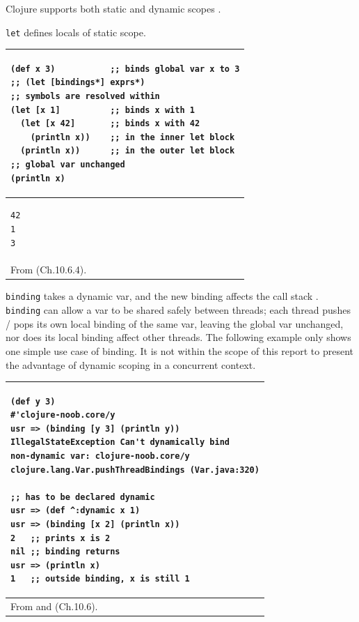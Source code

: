 \documentclass[12pt]{article}
\begin{document}
Clojure supports both static and dynamic scopes \cite{fogus2014joy}. 

\texttt{let} defines locals of static scope.


\begin{tabular}{|p{}|}
\hline
\begin{verbatim}
(def x 3)           ;; binds global var x to 3
;; (let [bindings*] exprs*)
;; symbols are resolved within 
(let [x 1]          ;; binds x with 1
  (let [x 42]       ;; binds x with 42
    (println x))    ;; in the inner let block
  (println x))      ;; in the outer let block
;; global var unchanged
(println x)
\end{verbatim}
\\
\hline
\begin{verbatim}
42
1
3
\end{verbatim}
\\
\hline
From \cite{empty} \cite{fogus2014joy} (Ch.10.6.4).\\
\hline
\end{tabular}

\texttt{binding} takes a dynamic var, and the new binding affects the call stack \cite{binding}. \texttt{binding} can allow a var to be shared safely between threads; each thread pushes / pops its own local binding of the same var, leaving the global var unchanged, nor does its local binding affect other threads. The following example only shows one simple use case of binding. It is not within the scope of this report to present the advantage of dynamic scoping in a concurrent context.



\begin{tabular}{|p{}|}
\hline
\begin{verbatim}
(def y 3)
#'clojure-noob.core/y
usr => (binding [y 3] (println y))
IllegalStateException Can't dynamically bind 
non-dynamic var: clojure-noob.core/y 
clojure.lang.Var.pushThreadBindings (Var.java:320)

;; has to be declared dynamic 
usr => (def ^:dynamic x 1)
usr => (binding [x 2] (println x))
2   ;; prints x is 2
nil ;; binding returns
usr => (println x)
1   ;; outside binding, x is still 1
\end{verbatim}
\\
\hline
From \cite{binding} and \cite{empty} (Ch.10.6).\\
\hline
\end{tabular}


\end{document}
